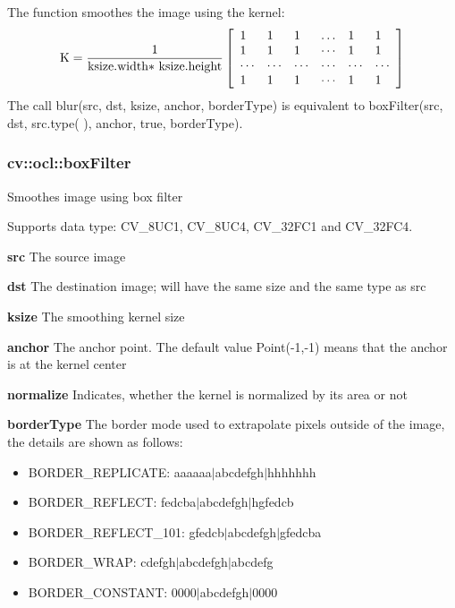 \documentclass{article}
\begin{document}
The function smoothes the image using the kernel:
\[
\mbox{K}=\frac{1}{\mbox{ksize.width$\ast$ ksize.height}}\left[
{{\begin{array}{*{20}c}
 1 \hfill & 1 \hfill & 1 \hfill & \ldots \hfill & 1 \hfill & 1 \hfill \\
 1 \hfill & 1 \hfill & 1 \hfill & \cdots \hfill & 1 \hfill & 1 \hfill \\
 \cdots \hfill & \cdots \hfill & \cdots \hfill & \cdots \hfill & \cdots
\hfill & \cdots \hfill \\
 1 \hfill & 1 \hfill & 1 \hfill & \cdots \hfill & 1 \hfill & 1 \hfill \\
\end{array} }} \right]
\]
The call blur(src, dst, ksize, anchor, borderType) is equivalent to
boxFilter(src, dst, src.type( ), anchor, true, borderType).

\newpage

\subsubsection{cv::ocl::boxFilter }
\label{subsubsec:mylabel33}
Smoothes image using box filter

Supports data type: CV{\_}8UC1, CV{\_}8UC4, CV{\_}32FC1 and CV{\_}32FC4.

\textbf{src }The source image

\textbf{dst }The destination image; will have the same size and the same
type as src

\textbf{ksize }The smoothing kernel size

\textbf{anchor }The anchor point. The default value Point(-1,-1) means that
the anchor is at the kernel center

\textbf{normalize }Indicates, whether the kernel is normalized by its area
or not

\textbf{borderType }The border mode used to extrapolate pixels outside of
the image, the details are shown as follows:

\begin{itemize}
\item BORDER{\_}REPLICATE: aaaaaa$\vert $abcdefgh$\vert $hhhhhhh
\item BORDER{\_}REFLECT: fedcba$\vert $abcdefgh$\vert $hgfedcb
\item BORDER{\_}REFLECT{\_}101: gfedcb$\vert $abcdefgh$\vert $gfedcba
\item BORDER{\_}WRAP: cdefgh$\vert $abcdefgh$\vert $abcdefg
\item BORDER{\_}CONSTANT: 0000$\vert $abcdefgh$\vert $0000
\end{itemize}
\end{document}
